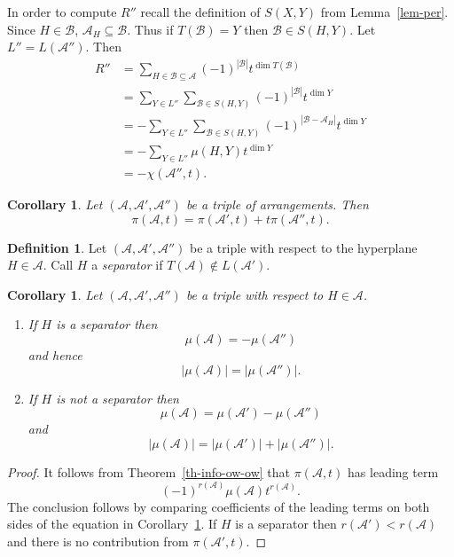 \documentclass{article}
\newtheorem{cor}[thm]{Corollary}
\theoremstyle{definition}
\newtheorem{defn}{Definition}[section]
\theoremstyle{remark}
\newcommand{\thmref}[1]{Theorem~\ref{#1}}
\newcommand{\lemref}[1]{Lemma~\ref{#1}}
\newcommand{\A}{\mathcal{A}}
\newcommand{\cB}{\mathcal{B}}
\newcommand{\envert}[1]{\left\lvert#1\right\rvert}
\let\abs=\envert
\begin{document}
In order to compute $R''$ recall the definition
of $S(X,Y)$ from \lemref{lem-per}. Since $H \in \cB$,
$\A_{H} \subseteq \cB$. Thus if $T(\cB) = Y$ then
$\cB \in S(H,Y)$. Let $L'' = L(\A'')$. Then
\begin{equation}\label{E_SXgYy}
\begin{split}
R''&= \sum_{H\in \cB \subseteq \A} (-1)^{\abs{\cB}}
t^{\dim T(\cB)}\\
&= \sum_{Y \in L''} \sum_{\cB \in S(H,Y)}
(-1)^{\abs{\cB}}t^{\dim Y} \\
&= -\sum_{Y \in L''} \sum_{\cB \in S(H,Y)} (-1)^
{\abs{\cB - \A_{H}}} t^{\dim Y} \\
&= -\sum_{Y \in L''} \mu (H,Y)t^{\dim Y} \\
&= -\chi (\A '',t).
\end{split}
\end{equation}

\begin{cor}\label{tripleA}
Let $(\A,\A',\A'')$ be a triple of arrangements. Then
\[ \pi (\A,t) = \pi (\A',t) + t \pi (\A'',t). \]
\end{cor}

\begin{defn}
Let $(\A,\A',\A'')$ be a triple with respect to
the hyperplane $H \in \A$. Call $H$ a \textit{separator}
if $T(\A) \not\in L(\A')$.
\end{defn}

\begin{cor}\label{nsep}
Let $(\A,\A',\A'')$ be a triple with respect to $H \in \A$.
\begin{enumerate}
\renewcommand{\labelenumi}{(\roman{enumi})}
\item
If $H$ is a separator then
\[ \mu (\A) = - \mu (\A'') \]
and hence
\[ \abs{\mu (\A)} = \abs{ \mu (\A'')}. \]

\item If $H$ is not a separator then
\[\mu (\A) = \mu (\A') - \mu (\A'') \]
and
\[ \abs{\mu (\A)} = \abs{\mu (\A')} + \abs{\mu (\A'')}. \]
\end{enumerate}
\end{cor}

\begin{proof}
It follows from \thmref{th-info-ow-ow} that $\pi(\A,t)$
has leading term
\[(-1)^{r(\A)}\mu (\A)t^{r(\A)}.\]
The conclusion
follows by comparing coefficients of the leading
terms on both sides of the equation in
Corollary~\ref{tripleA}. If $H$ is a separator then
$r(\A') < r(\A)$ and there is no contribution
from $\pi (\A',t)$.
\end{proof}
\end{document}
